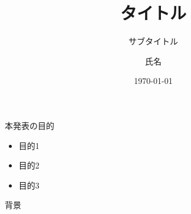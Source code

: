 \documentclass[dvipdfmx, 11pt, aspectratio=169, notheorems]{beamer}
\title[タイトル]{タイトル}
\subtitle{サブタイトル}
\author[氏名]{氏名}
\institute[早稲田大学]{早稲田大学 基幹理工学研究科 数学応用数理専攻\\清水研究室}
\date{\today}
\begin{document}
\begin{frame}
    \titlepage
\end{frame}

\begin{frame}{本発表の目的}
    \begin{itemize}
        \item 目的1
        \item 目的2
        \item 目的3
    \end{itemize}
\end{frame}

\begin{frame}{背景}
\end{frame}
\end{document}
